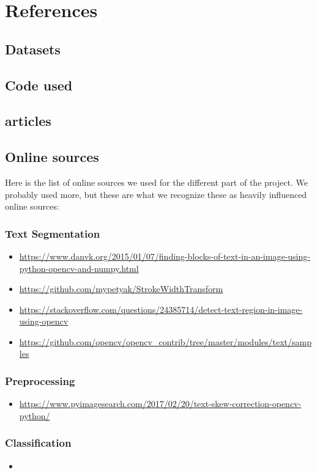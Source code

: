 \documentclass[Report.tex]{subfiles}
\begin{document}
\chapter{References}
\label{chap:References}
\section{Datasets}
\section{Code used}
\section{articles}
\section{Online sources}
Here is the list of online sources we used for the different part of the project. We probably used more, but these are what we recognize these as heavily influenced online sources:  

\subsection{Text Segmentation}
\begin{itemize}
    \item \url{https://www.danvk.org/2015/01/07/finding-blocks-of-text-in-an-image-using-python-opencv-and-numpy.html}
    \item \url{https://github.com/mypetyak/StrokeWidthTransform}
    \item \url{https://stackoverflow.com/questions/24385714/detect-text-region-in-image-using-opencv}
    \item \url{https://github.com/opencv/opencv_contrib/tree/master/modules/text/samples}
\end{itemize}
\subsection{Preprocessing}
\begin{itemize}
    \item \url{https://www.pyimagesearch.com/2017/02/20/text-skew-correction-opencv-python/}
\end{itemize}
\subsection{Classification}
\begin{itemize}
    \item 
\end{itemize}
\end{document}
